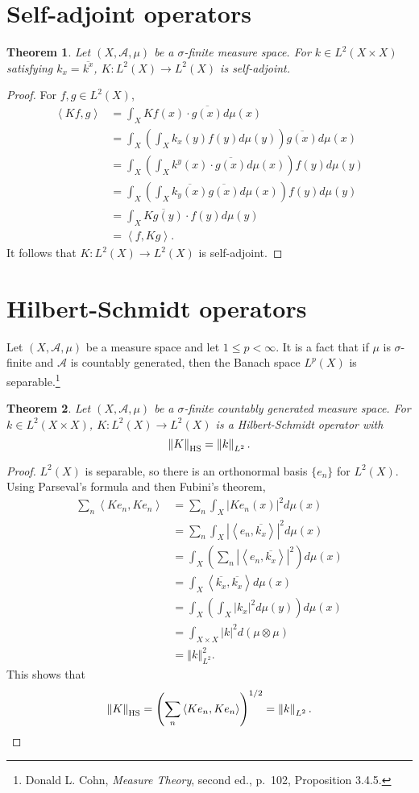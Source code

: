 \documentclass{article}
\newcommand{\inner}[2]{\left\langle #1, #2 \right\rangle}
\newcommand{\HS}{\ensuremath\mathrm{HS}}
\newcommand{\norm}[1]{\left\Vert #1 \right\Vert}
\newtheorem{theorem}{Theorem}
\theoremstyle{definition}
\begin{document}
\section{Self-adjoint operators}
\begin{theorem}
Let $(X,\mathscr{A},\mu)$ be a $\sigma$-finite measure space. For $k \in L^2(X \times X)$ satisfying
$k_x=\overline{k^x}$,
$K:L^2(X) \to L^2(X)$ is self-adjoint.
\end{theorem}
\begin{proof}
For $f,g \in L^2(X)$,
\begin{align*}
\inner{Kf}{g}&=\int_X Kf(x) \cdot \overline{g(x)} d\mu(x)\\
&=\int_X \left( \int_X k_x(y) f(y) d\mu(y) \right) \overline{g(x)} d\mu(x)\\
&=\int_X \left( \int_X k^y(x) \cdot  \overline{g(x)} d\mu(x) \right) f(y) d\mu(y)\\
&=\int_X \left( \int_X \overline{k_y(x)} \overline{g(x)} d\mu(x) \right) f(y) d\mu(y)\\
&=\int_X \overline{Kg(y)} \cdot f(y) d\mu(y)\\
&=\inner{f}{Kg}.
\end{align*}
It follows that $K:L^2(X) \to L^2(X)$ is self-adjoint. 
\end{proof}



\section{Hilbert-Schmidt operators}
Let $(X,\mathscr{A},\mu)$ be a measure space and let $1 \leq p < \infty$. It is a fact that if
$\mu$ is $\sigma$-finite and $\mathscr{A}$ is countably generated, then the Banach space 
$L^p(X)$ is separable.\footnote{Donald L. Cohn, {\em Measure Theory}, second ed.,
p.~102, Proposition 3.4.5.}

\begin{theorem}
Let $(X,\mathscr{A},\mu)$ be a $\sigma$-finite countably generated measure space.  
For $k \in L^2(X \times X)$, $K:L^2(X) \to L^2(X)$ is a Hilbert-Schmidt operator with
 \[
\norm{K}_{\HS} = \norm{k}_{L^2}.
 \]
\end{theorem}
\begin{proof}
$L^2(X)$ is separable, so there is an orthonormal basis $\{e_n\}$ for $L^2(X)$. 
Using Parseval's formula and then Fubini's theorem,
\begin{align*}
\sum_n \inner{Ke_n}{Ke_n}&=\sum_n \int_X |Ke_n(x)|^2 d\mu(x)\\
&=\sum_n \int_X |\inner{e_n}{\overline{k_x}}|^2 d\mu(x)\\
&=\int_X \left( \sum_n |\inner{e_n}{\overline{k_x}}|^2\right) d\mu(x)\\
&=\int_X \inner{\overline{k_x}}{\overline{k_x}} d\mu(x)\\
&=\int_X \left( \int_X |k_x|^2 d\mu(y) \right) d\mu(x)\\
&=\int_{X \times X} |k|^2 d(\mu \otimes \mu)\\
&=\norm{k}_{L^2}^2.
\end{align*}
This shows that
\[
\norm{K}_{\HS} = \left( \sum_n \inner{Ke_n}{Ke_n} \right)^{1/2}
= \norm{k}_{L^2}.
\]
\end{proof}
\end{document}
